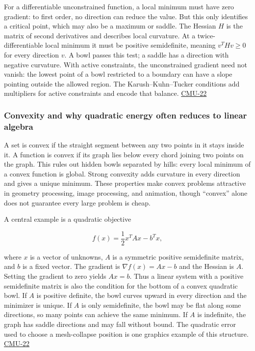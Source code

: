 For a differentiable unconstrained function, a local minimum must have zero gradient: to first order, no direction can reduce the value. But this only identifies a critical point, which may also be a maximum or saddle. The Hessian \(H\) is the matrix of second derivatives and describes local curvature. At a twice-differentiable local minimum it must be positive semidefinite, meaning \(v^T H v\ge0\) for every direction \(v\). A bowl passes this test; a saddle has a direction with negative curvature. With active constraints, the unconstrained gradient need not vanish: the lowest point of a bowl restricted to a boundary can have a slope pointing outside the allowed region. The Karush--Kuhn--Tucker conditions add multipliers for active constraints and encode that balance. \hyperref[04-visual-computing-ii-ch036]{CMU-22}

\subsubsection{Convexity and why quadratic energy often reduces to linear algebra}\label{convexity-and-why-quadratic-energy-often-reduces-to-linear-algebra}

A set is convex if the straight segment between any two points in it stays inside it. A function is convex if its graph lies below every chord joining two points on the graph. This rules out hidden bowls separated by hills: every local minimum of a convex function is global. Strong convexity adds curvature in every direction and gives a unique minimum. These properties make convex problems attractive in geometry processing, image processing, and animation, though ``convex'' alone does not guarantee every large problem is cheap.

A central example is a quadratic objective

\[
f(x)=\frac12 x^T A x-b^T x,
\]

where \(x\) is a vector of unknowns, \(A\) is a symmetric positive semidefinite matrix, and \(b\) is a fixed vector. The gradient is \(\nabla f(x)=Ax-b\) and the Hessian is \(A\). Setting the gradient to zero yields \(Ax=b\). Thus a linear system with a positive semidefinite matrix is also the condition for the bottom of a convex quadratic bowl. If \(A\) is positive definite, the bowl curves upward in every direction and the minimizer is unique. If \(A\) is only semidefinite, the bowl may be flat along some directions, so many points can achieve the same minimum. If \(A\) is indefinite, the graph has saddle directions and may fall without bound. The quadratic error used to choose a mesh-collapse position is one graphics example of this structure. \hyperref[04-visual-computing-ii-ch036]{CMU-22}

